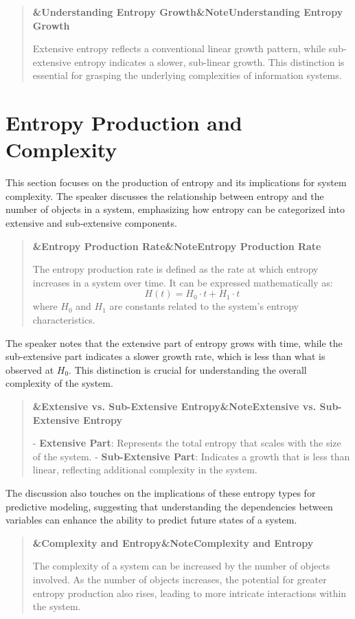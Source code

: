 \documentclass[a4paper]{article}
\newcommand{\boxheading}[1]{%
  \par\smallskip
  \noindent\textbf{\ifx&#1&Note\else#1\fi}\par
  \smallskip
}
\newenvironment{defbox}[1][]{%
  \begin{quote}\color{green!40!black}\boxheading{#1}\normalcolor
}{\end{quote}}
\newenvironment{exbox}[1][]{%
  \begin{quote}\color{brown!70!black}\boxheading{#1}\normalcolor
}{\end{quote}}
\newenvironment{rembox}[1][]{%
  \begin{quote}\color{black!70}\boxheading{#1}\normalcolor
}{\end{quote}}
\begin{document}
\begin{rembox}[Understanding Entropy Growth]
Extensive entropy reflects a conventional linear growth pattern, while sub-extensive entropy indicates a slower, sub-linear growth. This distinction is essential for grasping the underlying complexities of information systems.
\end{rembox}

\section{Entropy Production and Complexity}
This section focuses on the production of entropy and its implications for system complexity. The speaker discusses the relationship between entropy and the number of objects in a system, emphasizing how entropy can be categorized into extensive and sub-extensive components.

\begin{defbox}[Entropy Production Rate]
The entropy production rate is defined as the rate at which entropy increases in a system over time. It can be expressed mathematically as:
\[
H(t) = H_0 \cdot t + H_1 \cdot t
\]
where \( H_0 \) and \( H_1 \) are constants related to the system's entropy characteristics.
\end{defbox}

The speaker notes that the extensive part of entropy grows with time, while the sub-extensive part indicates a slower growth rate, which is less than what is observed at \( H_0 \). This distinction is crucial for understanding the overall complexity of the system.

\begin{rembox}[Extensive vs. Sub-Extensive Entropy]
- \textbf{Extensive Part}: Represents the total entropy that scales with the size of the system.
- \textbf{Sub-Extensive Part}: Indicates a growth that is less than linear, reflecting additional complexity in the system.
\end{rembox}

The discussion also touches on the implications of these entropy types for predictive modeling, suggesting that understanding the dependencies between variables can enhance the ability to predict future states of a system.

\begin{exbox}[Complexity and Entropy]
The complexity of a system can be increased by the number of objects involved. As the number of objects increases, the potential for greater entropy production also rises, leading to more intricate interactions within the system.
\end{exbox}
\end{document}
